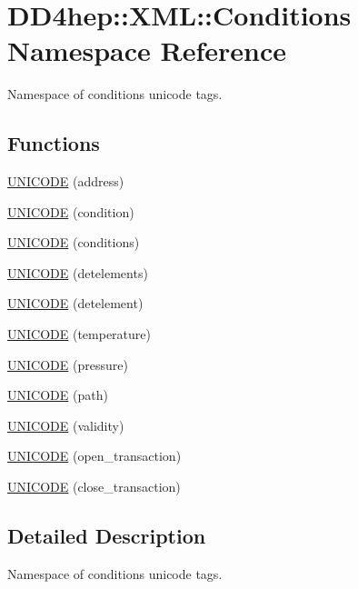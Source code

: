 \hypertarget{namespace_d_d4hep_1_1_x_m_l_1_1_conditions}{
\section{DD4hep::XML::Conditions Namespace Reference}
\label{namespace_d_d4hep_1_1_x_m_l_1_1_conditions}
}


Namespace of conditions unicode tags.  
\subsection*{Functions}
\begin{DoxyCompactItemize}
\item 
\hyperlink{namespace_d_d4hep_1_1_x_m_l_1_1_conditions_a5373ad820618f7d952564658d2fc4cca}{UNICODE} (address)
\item 
\hyperlink{namespace_d_d4hep_1_1_x_m_l_1_1_conditions_ac093cd39504ee451f2fbcf994d26075d}{UNICODE} (condition)
\item 
\hyperlink{namespace_d_d4hep_1_1_x_m_l_1_1_conditions_a093d9fab1388f560fa6d55926f5f83fd}{UNICODE} (conditions)
\item 
\hyperlink{namespace_d_d4hep_1_1_x_m_l_1_1_conditions_a02e5ebe727f41aef055c9ad425d0fe43}{UNICODE} (detelements)
\item 
\hyperlink{namespace_d_d4hep_1_1_x_m_l_1_1_conditions_a05b5d8b1289036d694eee2c28a6997f8}{UNICODE} (detelement)
\item 
\hyperlink{namespace_d_d4hep_1_1_x_m_l_1_1_conditions_ae49c95fc28ac05985c3ce1fe4340f888}{UNICODE} (temperature)
\item 
\hyperlink{namespace_d_d4hep_1_1_x_m_l_1_1_conditions_a9c6ea9652e1ceb1b588f4d032d43365a}{UNICODE} (pressure)
\item 
\hyperlink{namespace_d_d4hep_1_1_x_m_l_1_1_conditions_a5dba8de772bb2c909d53918606865cb9}{UNICODE} (path)
\item 
\hyperlink{namespace_d_d4hep_1_1_x_m_l_1_1_conditions_a4b1aedbbdeb90f5760cb652b73627e50}{UNICODE} (validity)
\item 
\hyperlink{namespace_d_d4hep_1_1_x_m_l_1_1_conditions_a9e72d71de115bf1f93f71ae147c66f8d}{UNICODE} (open\_\-transaction)
\item 
\hyperlink{namespace_d_d4hep_1_1_x_m_l_1_1_conditions_ae58987a149ce1c597ae2c64aab52892a}{UNICODE} (close\_\-transaction)
\end{DoxyCompactItemize}


\subsection{Detailed Description}
Namespace of conditions unicode tags. 

